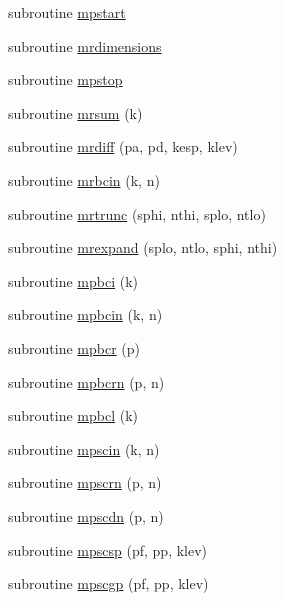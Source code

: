 \begin{DoxyCompactItemize}
\item 
subroutine \hyperlink{mpimod__multi_8f90_a41bbd9334a3d0412c73399d699bbb237}{mpstart}
\item 
subroutine \hyperlink{mpimod__multi_8f90_acb4a2403b5f65a70e7e5ff01ea4577f7}{mrdimensions}
\item 
subroutine \hyperlink{mpimod__multi_8f90_ac80e83b9bc0a4b459fed5f3b79cfafa0}{mpstop}
\item 
subroutine \hyperlink{mpimod__multi_8f90_a5d2bb9cfe68e5feb6de6b359f04398e3}{mrsum} (k)
\item 
subroutine \hyperlink{mpimod__multi_8f90_a81baf40d09fd23640c01877173e0813a}{mrdiff} (pa, pd, kesp, klev)
\item 
subroutine \hyperlink{mpimod__multi_8f90_a7fd328bc0c83a30f521615978d5d44b2}{mrbcin} (k, n)
\item 
subroutine \hyperlink{mpimod__multi_8f90_a63020ca5fd4738534a8ad6f1ce97133d}{mrtrunc} (sphi, nthi, splo, ntlo)
\item 
subroutine \hyperlink{mpimod__multi_8f90_a7878a87944a3261177c0321cb0d01174}{mrexpand} (splo, ntlo, sphi, nthi)
\item 
subroutine \hyperlink{mpimod__multi_8f90_a89982355acc98319bfc191dab28da805}{mpbci} (k)
\item 
subroutine \hyperlink{mpimod__multi_8f90_a85cfae5acde5c37604edf690e9c2f7cf}{mpbcin} (k, n)
\item 
subroutine \hyperlink{mpimod__multi_8f90_aded092db7f8071a727e2e96887702ca7}{mpbcr} (p)
\item 
subroutine \hyperlink{mpimod__multi_8f90_af2a0a009162180d4abb1daa1bad60cf2}{mpbcrn} (p, n)
\item 
subroutine \hyperlink{mpimod__multi_8f90_a40b910e38273e7f3c9dc4ed36d3e67a0}{mpbcl} (k)
\item 
subroutine \hyperlink{mpimod__multi_8f90_a8338d8609afcefbb1faa41f353c10ef9}{mpscin} (k, n)
\item 
subroutine \hyperlink{mpimod__multi_8f90_a1504cf64a1ffc198a8a1fe54ba00d775}{mpscrn} (p, n)
\item 
subroutine \hyperlink{mpimod__multi_8f90_a3d2a5d231fd9527bcbc1fde327326922}{mpscdn} (p, n)
\item 
subroutine \hyperlink{mpimod__multi_8f90_a0c5adf4e8c7e39cf5a1038a1d34ebf30}{mpscsp} (pf, pp, klev)
\item 
subroutine \hyperlink{mpimod__multi_8f90_ac66e76c6144dfeadbc03bc5817553250}{mpscgp} (pf, pp, klev)
\item 

\end{DoxyCompactItemize}
